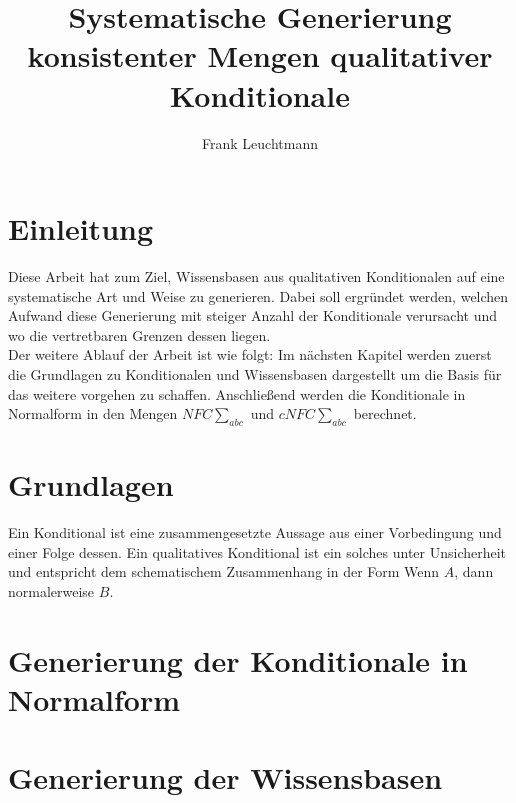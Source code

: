 \documentclass[12pt,a4paper]{article}
\author{Frank Leuchtmann}
\title{Systematische Generierung konsistenter Mengen qualitativer
Konditionale}
\begin{document}
\maketitle
\newpage
\tableofcontents
\newpage
\section{Einleitung}
Diese Arbeit hat zum Ziel, Wissensbasen aus qualitativen Konditionalen auf eine systematische Art und Weise zu generieren. Dabei soll ergründet werden, welchen Aufwand diese Generierung mit steiger Anzahl der Konditionale verursacht und wo die vertretbaren Grenzen dessen liegen.
\\
Der weitere Ablauf der Arbeit ist wie folgt: Im nächsten Kapitel werden zuerst die Grundlagen zu Konditionalen und Wissensbasen dargestellt um die Basis für das weitere vorgehen zu schaffen. Anschließend werden die Konditionale in Normalform in den Mengen $NFC\sum_{abc}$ und $cNFC\sum_{abc}$ berechnet.
\section{Grundlagen}
Ein Konditional ist eine zusammengesetzte Aussage aus einer Vorbedingung und einer Folge dessen. Ein qualitatives Konditional ist ein solches unter  Unsicherheit und entspricht dem schematischem Zusammenhang in der Form \grqq Wenn $A$, dann normalerweise $B$\grqq .
\cite{beierle17}
\section{Generierung der Konditionale in Normalform}
\section{Generierung der Wissensbasen}


 
\end{document}
